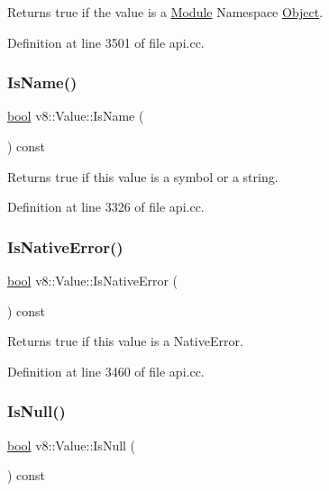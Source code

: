 Returns true if the value is a \mbox{\hyperlink{classv8_1_1Module}{Module}} Namespace \mbox{\hyperlink{classv8_1_1Object}{Object}}. 

Definition at line 3501 of file api.\+cc.

\mbox{\label{classv8_1_1Value_a1ae3d5f5823705d2b6c26378201b772b}} 
\subsubsection{\texorpdfstring{Is\+Name()}{IsName()}}
{\footnotesize\ttfamily \mbox{\hyperlink{classbool}{bool}} v8\+::\+Value\+::\+Is\+Name (\begin{DoxyParamCaption}{ }\end{DoxyParamCaption}) const}

Returns true if this value is a symbol or a string. 

Definition at line 3326 of file api.\+cc.

\mbox{\label{classv8_1_1Value_a7dc01ab1db65640f774366e8ecab91df}} 
\subsubsection{\texorpdfstring{Is\+Native\+Error()}{IsNativeError()}}
{\footnotesize\ttfamily \mbox{\hyperlink{classbool}{bool}} v8\+::\+Value\+::\+Is\+Native\+Error (\begin{DoxyParamCaption}{ }\end{DoxyParamCaption}) const}

Returns true if this value is a Native\+Error. 

Definition at line 3460 of file api.\+cc.

\mbox{\label{classv8_1_1Value_a7710cf2aca870e961f1df65ef6057eb4}} 
\subsubsection{\texorpdfstring{Is\+Null()}{IsNull()}}
{\footnotesize\ttfamily \mbox{\hyperlink{classbool}{bool}} v8\+::\+Value\+::\+Is\+Null (\begin{DoxyParamCaption}{ }\end{DoxyParamCaption}) const}

